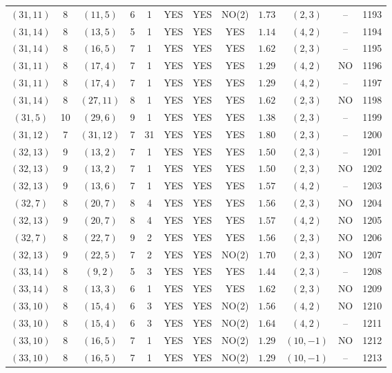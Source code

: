 \begin{longtable}{|c|c|c|c|c|c|c|c|c|c|c|c|}
$(31,11)$ & 8 & $(11,5)$ & 6 & 1 & YES & YES & NO(2) & $1.73$ & $(2,3)$ & -- & 1193\\
$(31,14)$ & 8 & $(13,5)$ & 5 & 1 & YES & YES & YES & $1.14$ & $(4,2)$ & -- & 1194\\
$(31,14)$ & 8 & $(16,5)$ & 7 & 1 & YES & YES & YES & $1.62$ & $(2,3)$ & -- & 1195\\
$(31,11)$ & 8 & $(17,4)$ & 7 & 1 & YES & YES & YES & $1.29$ & $(4,2)$ & NO & 1196\\
$(31,11)$ & 8 & $(17,4)$ & 7 & 1 & YES & YES & YES & $1.29$ & $(4,2)$ & -- & 1197\\
$(31,14)$ & 8 & $(27,11)$ & 8 & 1 & YES & YES & YES & $1.62$ & $(2,3)$ & NO & 1198\\
$(31,5)$ & 10 & $(29,6)$ & 9 & 1 & YES & YES & YES & $1.38$ & $(2,3)$ & -- & 1199\\
$(31,12)$ & 7 & $(31,12)$ & 7 & 31 & YES & YES & YES & $1.80$ & $(2,3)$ & -- & 1200\\
$(32,13)$ & 9 & $(13,2)$ & 7 & 1 & YES & YES & YES & $1.50$ & $(2,3)$ & -- & 1201\\
$(32,13)$ & 9 & $(13,2)$ & 7 & 1 & YES & YES & YES & $1.50$ & $(2,3)$ & NO & 1202\\
$(32,13)$ & 9 & $(13,6)$ & 7 & 1 & YES & YES & YES & $1.57$ & $(4,2)$ & -- & 1203\\
$(32,7)$ & 8 & $(20,7)$ & 8 & 4 & YES & YES & YES & $1.56$ & $(2,3)$ & NO & 1204\\
$(32,13)$ & 9 & $(20,7)$ & 8 & 4 & YES & YES & YES & $1.57$ & $(4,2)$ & NO & 1205\\
$(32,7)$ & 8 & $(22,7)$ & 9 & 2 & YES & YES & YES & $1.56$ & $(2,3)$ & NO & 1206\\
$(32,13)$ & 9 & $(22,5)$ & 7 & 2 & YES & YES & NO(2) & $1.70$ & $(2,3)$ & NO & 1207\\
$(33,14)$ & 8 & $(9,2)$ & 5 & 3 & YES & YES & YES & $1.44$ & $(2,3)$ & -- & 1208\\
$(33,14)$ & 8 & $(13,3)$ & 6 & 1 & YES & YES & YES & $1.62$ & $(2,3)$ & NO & 1209\\
$(33,10)$ & 8 & $(15,4)$ & 6 & 3 & YES & YES & NO(2) & $1.56$ & $(4,2)$ & NO & 1210\\
$(33,10)$ & 8 & $(15,4)$ & 6 & 3 & YES & YES & NO(2) & $1.64$ & $(4,2)$ & -- & 1211\\
$(33,10)$ & 8 & $(16,5)$ & 7 & 1 & YES & YES & NO(2) & $1.29$ & $(10,-1)$ & NO & 1212\\
$(33,10)$ & 8 & $(16,5)$ & 7 & 1 & YES & YES & NO(2) & $1.29$ & $(10,-1)$ & -- & 1213\\

\end{longtable}
